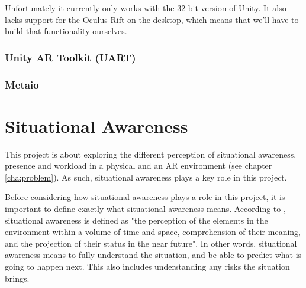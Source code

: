				Unfortunately it currently only works with the 32-bit version of
				Unity. It also lacks support for the Oculus Rift on the desktop,
				which means that we'll have to build that functionality ourselves.

			\subsubsection{Unity AR Toolkit (UART)} \label{sssec:uart}


			\subsubsection{Metaio} \label{sssec:metaio}


	\section{Situational Awareness} \label{sec:awareness}
		This project is about exploring the different perception of situational
		awareness, presence and workload in a physical and an AR environment
		(see chapter \ref{cha:problem}). As such, situational awareness plays a
		key role in this project.

		Before considering how situational awareness plays a role in this project,
		it is important to define exactly what situational awareness means.
		According to \cite{endsley}, situational awareness is defined as "the
		perception of the elements in the environment within a volume of time and
		space, comprehension of their meaning, and the projection of their status in
		the near future". In other words, situational awareness means to
		fully understand the situation, and be able to predict what is going to
		happen next. This also includes understanding any risks the situation brings.


